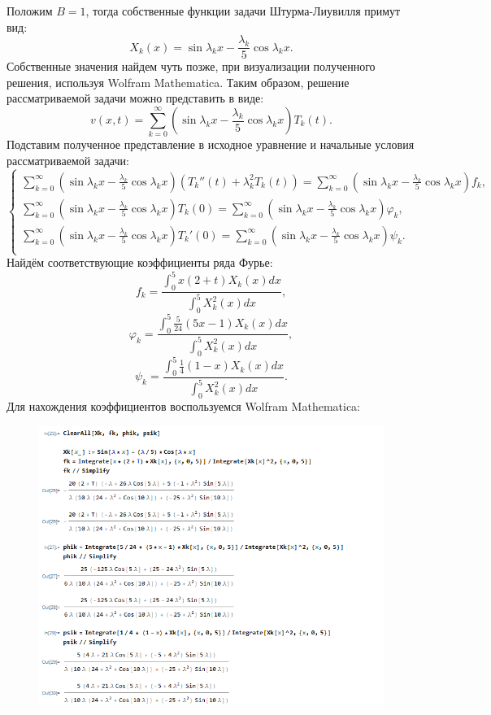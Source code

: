 \documentclass[11pt]{article}
\begin{document}
Положим $B=1$, тогда собственные функции задачи Штурма-Лиувилля примут вид: $$X_k(x)=\sin{\lambda_k x}-\frac{\lambda_k}{5}\cos{\lambda_k x}.$$
Собственные значения найдем чуть позже, при визуализации полученного решения, используя Wolfram Mathematica.
Таким образом, решение рассматриваемой задачи можно представить в виде:
$$v(x,t)=\sum^\infty_{k=0}(\sin{\lambda_k x}-\frac{\lambda_k}{5}\cos{\lambda_k x})T_k(t).$$
Подставим полученное представление в исходное уравнение и начальные условия рассматриваемой задачи:
$$\begin{cases}
    \sum^\infty_{k=0}(\sin{\lambda_k x}-\frac{\lambda_k}{5}\cos{\lambda_k x})(T_k''(t)+\lambda_k^2 T_k(t))=\sum^\infty_{k=0}(\sin{\lambda_k x}-\frac{\lambda_k}{5}\cos{\lambda_k x})f_k,\\
    \sum^\infty_{k=0}(\sin{\lambda_k x}-\frac{\lambda_k}{5}\cos{\lambda_k x})T_k(0)=\sum^\infty_{k=0}(\sin{\lambda_k x}-\frac{\lambda_k}{5}\cos{\lambda_k x})\varphi_k,\\
    \sum^\infty_{k=0}(\sin{\lambda_k x}-\frac{\lambda_k}{5}\cos{\lambda_k x})T_k'(0)=\sum^\infty_{k=0}(\sin{\lambda_k x}-\frac{\lambda_k}{5}\cos{\lambda_k x})\psi_k.\\
\end{cases}$$
Найдём соответствующие коэффициенты ряда Фурье:
$$f_k=\frac{\int_0^5x(2+t)X_k(x)dx}{\int_0^5X_k^2(x)dx},$$
$$\varphi_k=\frac{\int_0^5\frac{5}{24}(5x-1)X_k(x)dx}{\int_0^5X_k^2(x)dx},$$
$$\psi_k=\frac{\int_0^5\frac{1}{4}(1-x)X_k(x)dx}{\int_0^5X_k^2(x)dx}.$$
Для нахождения коэффициентов воспользуемся Wolfram Mathematica:
\begin{figure}
    \centering
    \includegraphics[width=1\linewidth]{image1.png}
\end{figure}
\end{document}
